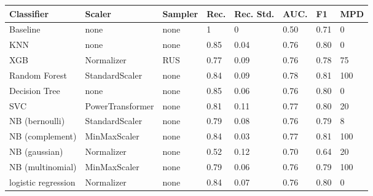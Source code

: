 
\begin{table}[]

	\begin{footnotesize}
		\begin{tabular}{|l|l|l|l|l|l|l|l|}
			\hline
			\textbf{Classifier} & \textbf{Scaler}  & \textbf{Sampler} & \textbf{Rec.} & \textbf{Rec. Std.} & \textbf{AUC.} & \textbf{F1} & \textbf{MPD} \\ \hline
			Baseline            & none             & none             & 1             & 0                  & 0.50         & 0.71        & 0            \\ \hline
			KNN                 & none             & none             & 0.85          & 0.04               & 0.76         & 0.80        & 0            \\ \hline
			XGB                 & Normalizer       & RUS              & 0.77          & 0.09               & 0.76         & 0.78        & 75           \\ \hline
			Random Forest       & StandardScaler   & none             & 0.84          & 0.09               & 0.78         & 0.81        & 100          \\ \hline
			Decision Tree       & none             & none             & 0.85          & 0.06               & 0.76         & 0.80        & 0            \\ \hline
			SVC                 & PowerTransformer & none             & 0.81          & 0.11               & 0.77         & 0.80        & 20           \\ \hline
			NB (bernoulli)      & StandardScaler   & none             & 0.79          & 0.08               & 0.76         & 0.79        & 8            \\ \hline
			NB (complement)     & MinMaxScaler     & none             & 0.84          & 0.03               & 0.77         & 0.81        & 100          \\ \hline
			NB (gaussian)       & Normalizer       & none             & 0.52          & 0.12               & 0.70         & 0.64        & 20           \\ \hline
			NB (multinomial)    & MinMaxScaler     & none             & 0.79          & 0.06               & 0.76         & 0.79        & 100          \\ \hline
			logistic regression & Normalizer       & none             & 0.84          & 0.07               & 0.76         & 0.80        & 0            \\ \hline
		\end{tabular}


\end{footnotesize}
\end{table}
